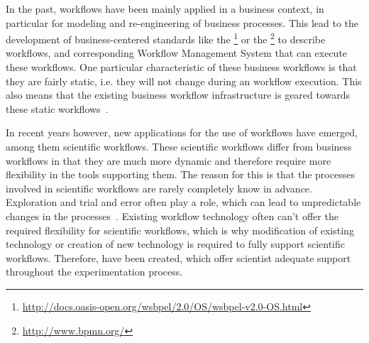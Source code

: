 In the past, workflows have been mainly applied in a business context, in particular for modeling and re-engineering of business processes.
This lead to the development of business-centered standards like the \footnote{\url{http://docs.oasis-open.org/wsbpel/2.0/OS/wsbpel-v2.0-OS.html}} or the \footnote{\url{http://www.bpmn.org/}} to describe workflows, and corresponding Workflow Management System that can execute these workflows.
One particular characteristic of these business workflows is that they are fairly static, i.e. they will not change during an workflow execution.
This also means that the existing business workflow infrastructure is geared towards these static workflows~\autocite{wasa}.

In recent years however, new applications for the use of workflows have emerged, among them scientific workflows.
These scientific workflows differ from business workflows in that they are much more dynamic and therefore require more flexibility in the tools supporting them.
The reason for this is that the processes involved in scientific workflows are rarely completely know in advance.
Exploration and trial and error often play a role, which can lead to unpredictable changes in the processes~\autocite{wasa}.
Existing workflow technology often can't offer the required flexibility for scientific workflows, which is why modification of existing technology or creation of new technology is required to fully support scientific workflows.
Therefore,  have been created, which offer scientist adequate support throughout the experimentation process.
